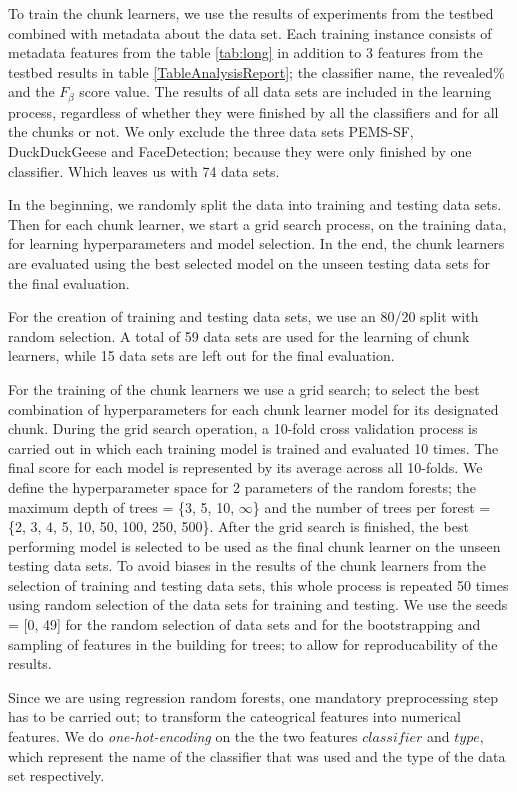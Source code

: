 To train the chunk learners, we use the results of experiments from the testbed combined with metadata about the data set.
Each training instance consists of metadata features from the table \ref{tab:long} in addition to 3 features from the testbed results in table \ref{TableAnalysisReport}; the classifier name, the revealed\% and the $F_{\beta}$ score value.
The results of all data sets are included in the learning process, regardless of whether they were finished by all the classifiers and for all the chunks or not.
We only exclude the three data sets PEMS-SF, DuckDuckGeese and FaceDetection; because they were only finished by one classifier. Which leaves us with 74 data sets.

In the beginning, we randomly split the data into training and testing data sets.
Then for each chunk learner, we start a grid search process, on the training data, for learning hyperparameters and model selection.
In the end, the chunk learners are evaluated using the best selected model on the unseen testing data sets for the final evaluation.

For the creation of training and testing data sets, we use an 80/20 split with random selection.
A total of 59 data sets are used for the learning of chunk learners, while 15 data sets are left out for the final evaluation.

For the training of the chunk learners we use a grid search; to select the best combination of hyperparameters for each chunk learner model for its designated chunk.
During the grid search operation, a 10-fold cross validation process is carried out in which each training model is trained and evaluated 10 times.
The final score for each model is represented by its average across all 10-folds.
We define the hyperparameter space for 2 parameters of the random forests; the maximum depth of trees = \{3, 5, 10, $\infty$\} and the number of trees per forest = \{2, 3, 4, 5, 10, 50, 100, 250, 500\}.
After the grid search is finished, the best performing model is selected to be used as the final chunk learner on the unseen testing data sets.
To avoid biases in the results of the chunk learners from the selection of training and testing data sets, this whole process is repeated 50 times using random selection of the data sets for training and testing.
We use the seeds = [0, 49] for the random selection of data sets and for the bootstrapping and sampling of features in the building for trees; to allow for reproducability of the results.

Since we are using regression random forests, one mandatory preprocessing step has to be carried out; to transform the cateogrical features into numerical features.
We do \emph{one-hot-encoding} on the the two features $classifier$ and $type$, which represent the name of the classifier that was used and the type of the data set respectively.

